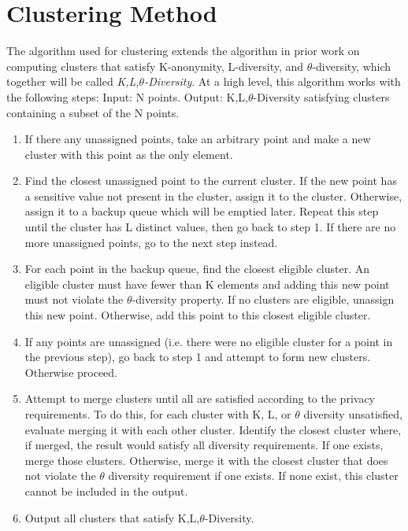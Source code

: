 \section{Clustering Method}
The algorithm used for clustering extends the algorithm in prior work\cite{yangEnhanced} on computing clusters that satisfy K-anonymity, L-diversity, and $\theta$-diversity, which together will be called \emph{K,L,$\theta$-Diversity}. At a high level, this algorithm works with the following steps:
Input: N points.
Output: K,L,$\theta$-Diversity satisfying clusters containing a subset of the N points.
\begin{enumerate}
    \item If there any unassigned points, take an arbitrary point and make a new cluster with this point as the only element.
    \item Find the closest unassigned point to the current cluster. If the new point has a sensitive value not present in the cluster, assign it to the cluster. Otherwise, assign it to a backup queue which will be emptied later. Repeat this step until the cluster has L distinct values, then go back to step 1. If there are no more unassigned points, go to the next step instead.
    \item For each point in the backup queue, find the closest eligible cluster. An eligible cluster must have fewer than K elements and adding this new point must not violate the $\theta$-diversity property. If no clusters are eligible, unassign this new point. Otherwise, add this point to this closest eligible cluster.
    \item If any points are unassigned (i.e. there were no eligible cluster for a point in the previous step), go back to step 1 and attempt to form new clusters. Otherwise proceed.
    \item Attempt to merge clusters until all are satisfied according to the privacy requirements. To do this, for each cluster with K, L, or $\theta$ diversity unsatisfied, evaluate merging it with each other cluster. Identify the closest cluster where, if merged, the result would satisfy all diversity requirements. If one exists, merge those clusters. Otherwise, merge it with the closest cluster that does not violate the $\theta$ diversity requirement if one exists. If none exist, this cluster cannot be included in the output.
    \item Output all clusters that satisfy K,L,$\theta$-Diversity.
\end{enumerate}


